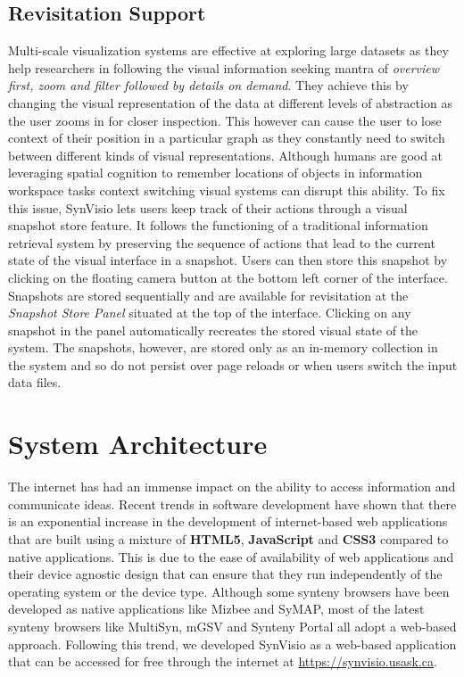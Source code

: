 \subsection{Revisitation Support}
Multi-scale visualization systems are effective at exploring large datasets as they help researchers in following the visual information seeking mantra of \textit{overview first, zoom and filter followed by details on demand}\cite{Shneiderman96theeyes}. They achieve this by changing the visual representation of the data at different levels of abstraction as the user zooms in for closer inspection\cite{Stolte}. This however can cause the user to lose context of their position in a particular graph as they constantly need to switch between different kinds of visual representations.
Although humans are good at leveraging spatial cognition to remember locations of objects in information workspace tasks\cite{datamountain} context switching visual systems can disrupt this ability. To fix this issue, SynVisio lets users keep track of their actions through a visual snapshot store feature. It follows the functioning of a traditional information retrieval system by preserving the sequence of actions that lead to the current state of the visual interface in a snapshot. Users can then store this snapshot by clicking on the floating camera button at the bottom left corner of the interface. Snapshots are stored sequentially and are available for revisitation at the \textit{Snapshot Store Panel} situated at the top of the interface. Clicking on any snapshot in the panel automatically recreates the stored visual state of the system. The snapshots, however, are stored only as an in-memory collection in the system and so do not persist over page reloads or when users switch the input data files.


\section{System Architecture}

The internet has had an immense impact on the ability to access information and communicate ideas. Recent trends in software development have shown that there is an exponential increase in the development of internet-based web applications that are built using a mixture of \textbf{HTML5}, \textbf{JavaScript} and \textbf{CSS3} compared to native applications.
This is due to the ease of availability of web applications and their device agnostic design that can ensure that they run independently of the operating system or the device type. Although some synteny browsers have been developed as native applications like Mizbee and SyMAP\cite{Meyer2009,soderlund2011symap}, most of the latest synteny browsers like MultiSyn, mGSV and Synteny Portal\cite{baek2016multisyn,revanna2011gsv,lee2016syntenyportal} all adopt a web-based approach. Following this trend, we developed SynVisio as a web-based application that can be accessed for free through the internet at \url{https://synvisio.usask.ca}.

